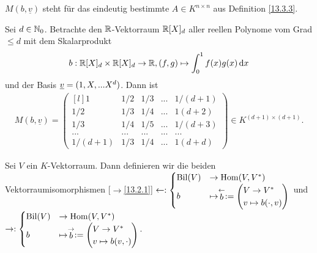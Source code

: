 \documentclass[../../main.tex]{subfiles}
\begin{document}
\begin{nt}\label{13.3.5}  
$M(b,\underline{v})$ steht für das eindeutig bestimmte $A\in K^{n\times n}$ aus Definition \ref{13.3.3}.
\end{nt}

\begin{bsp}\label{13.3.6}
Sei $d\in \mathbb N_0$. Betrachte den $\mathbb R$-Vektorraum $\mathbb R[X]_d$ aller reellen Polynome vom Grad $\le d$ mit dem Skalarprodukt
\begin{align*}
b: \mathbb R[X]_d\times \mathbb R[X]_d\to \mathbb R, (f,g)\mapsto \int_0^1 f(x)g(x)\,\text{d}x
\end{align*}
und der Basis ${\underline v}=(1,X,...X^d)$. Dann ist
\begin{align*}
M(b,\underline{v})=\begin{pmatrix*}[l]
1& 1/2& 1/3&...&1/(d+1)\\
1/2 &1/3& 1/4&...&1(d+2)\\
1/3& 1/4& 1/5&...&1/(d+3)\\
... &...& ...&...&...\\
1/(d+1) &1/3& 1/4&...&1(d+d)
\end{pmatrix*}\in K^{(d+1)\times(d+1)}.
\end{align*}
\end{bsp}
	
\begin{df}\label{13.3.7}
Sei $V$ ein $K$-Vektorraum. Dann definieren wir die beiden Vektorraumisomorphismen [$\to$\ref{13.2.1}] $\leftarrow: \begin{cases}\Bil(V)&\to\Hom(V,V^*)\\b&\mapsto \lvec b:=\begin{pmatrix*}[l]V\to V^*\\ v\mapsto b(\cdot, v)\end{pmatrix*}\end{cases}$ und\\ $\rightarrow: \begin{cases}\Bil(V)&\to\Hom(V,V^*)\\b&\mapsto \rvec b:=\begin{pmatrix*}[l]V\to V^*\\ v\mapsto b(v, \cdot)\end{pmatrix*}\end{cases}$.
\end{df}
\end{document}
